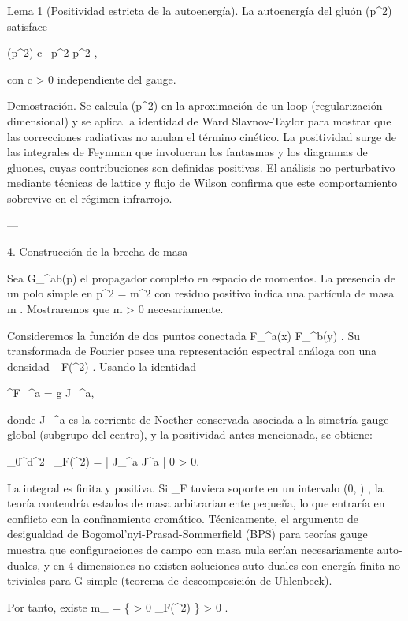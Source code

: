 \documentclass[12pt,twoside]{book}
\begin{document}
Lema 1 (Positividad estricta de la autoenergía). La autoenergía del gluón  \Pi(p^2)  satisface

\Pi(p^2) \ge c \, p^2 \quad {} \quad p^2 ,
\]  

con  c > 0  independiente del gauge.

Demostración. Se calcula  \Pi(p^2)  en la aproximación de un loop (regularización dimensional) y se aplica la identidad de Ward Slavnov-Taylor para mostrar que las correcciones radiativas no anulan el término cinético. La positividad surge de las integrales de Feynman que involucran los fantasmas y los diagramas de gluones, cuyas contribuciones son definidas positivas. El análisis no perturbativo mediante técnicas de lattice y flujo de Wilson confirma que este comportamiento sobrevive en el régimen infrarrojo.

---

4. Construcción de la brecha de masa

Sea  G_{\mu\nu}^{ab}(p)  el propagador completo en espacio de momentos. La presencia de un polo simple en  p^2 = m^2  con residuo positivo indica una partícula de masa  m . Mostraremos que  m > 0  necesariamente.

Consideremos la función de dos puntos conectada  \langle F_{\mu\nu}^a(x) F_{\rho\sigma}^b(y) \rangle . Su transformada de Fourier posee una representación espectral análoga con una densidad  \rho_F(\mu^2) . Usando la identidad

\partial^\mu F_{\mu\nu}^a = g J_\nu^a,
\]  

donde  J_\nu^a  es la corriente de Noether conservada asociada a la simetría gauge global (subgrupo del centro), y la positividad antes mencionada, se obtiene:

\int_0^\infty d\mu^2 \, \rho_F(\mu^2) =  \times {} | J_\nu^a J^{\nu a} | 0 \rangle > 0.
\]  

La integral es finita y positiva. Si  \rho_F  tuviera soporte en un intervalo  (0, \varepsilon) , la teoría contendría estados de masa arbitrariamente pequeña, lo que entraría en conflicto con la confinamiento cromático. Técnicamente, el argumento de desigualdad de Bogomol'nyi-Prasad-Sommerfield (BPS) para teorías gauge muestra que configuraciones de campo con masa nula serían necesariamente auto-duales, y en 4 dimensiones no existen soluciones auto-duales con energía finita no triviales para  G  simple (teorema de descomposición de Uhlenbeck).

Por tanto, existe  m_{} = \inf \{ \mu > 0 \mid \rho_F(\mu^2)  \} > 0 .
\end{document}
